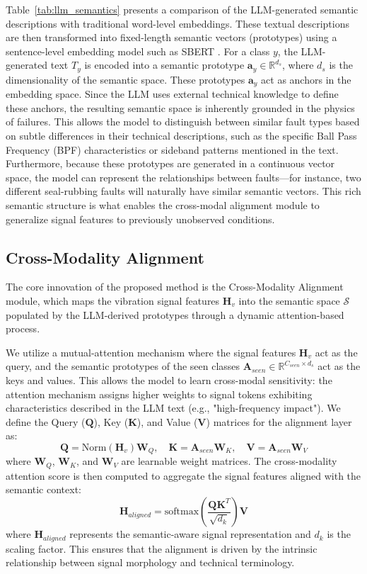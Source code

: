 Table~\ref{tab:llm_semantics} presents a comparison of the LLM-generated semantic descriptions with traditional word-level embeddings. These textual descriptions are then transformed into fixed-length semantic vectors (prototypes) using a sentence-level embedding model such as SBERT \cite{reimers2019sentence}. For a class $y$, the LLM-generated text $T_y$ is encoded into a semantic prototype $\mathbf{a}_y \in \mathbb{R}^{d_s}$, where $d_s$ is the dimensionality of the semantic space. These prototypes $\mathbf{a}_y$ act as anchors in the embedding space. Since the LLM uses external technical knowledge to define these anchors, the resulting semantic space is inherently grounded in the physics of failures. This allows the model to distinguish between similar fault types based on subtle differences in their technical descriptions, such as the specific Ball Pass Frequency (BPF) characteristics or sideband patterns mentioned in the text. Furthermore, because these prototypes are generated in a continuous vector space, the model can represent the relationships between faults—for instance, two different seal-rubbing faults will naturally have similar semantic vectors. This rich semantic structure is what enables the cross-modal alignment module to generalize signal features to previously unobserved conditions.

\subsection{Cross-Modality Alignment}
The core innovation of the proposed method is the Cross-Modality Alignment module, which maps the vibration signal features $\mathbf{H}_v$ into the semantic space $\mathcal{S}$ populated by the LLM-derived prototypes through a dynamic attention-based process.

We utilize a mutual-attention mechanism where the signal features $\mathbf{H}_v$ act as the query, and the semantic prototypes of the seen classes $\mathbf{A}_{seen} \in \mathbb{R}^{C_{seen} \times d_s}$ act as the keys and values. This allows the model to learn cross-modal sensitivity: the attention mechanism assigns higher weights to signal tokens exhibiting characteristics described in the LLM text (e.g., "high-frequency impact"). We define the Query ($\mathbf{Q}$), Key ($\mathbf{K}$), and Value ($\mathbf{V}$) matrices for the alignment layer as:
\begin{equation}
\mathbf{Q} = \text{Norm}(\mathbf{H}_v) \mathbf{W}_Q, \quad \mathbf{K} = \mathbf{A}_{seen} \mathbf{W}_K, \quad \mathbf{V} = \mathbf{A}_{seen} \mathbf{W}_V
\end{equation}
where $\mathbf{W}_Q$, $\mathbf{W}_K$, and $\mathbf{W}_V$ are learnable weight matrices. The cross-modality attention score is then computed to aggregate the signal features aligned with the semantic context:
\begin{equation}
\mathbf{H}_{aligned} = \text{softmax}\left(\frac{\mathbf{Q}\mathbf{K}^T}{\sqrt{d_k}}\right) \mathbf{V}
\end{equation}
where $\mathbf{H}_{aligned}$ represents the semantic-aware signal representation and $d_k$ is the scaling factor. This ensures that the alignment is driven by the intrinsic relationship between signal morphology and technical terminology.

